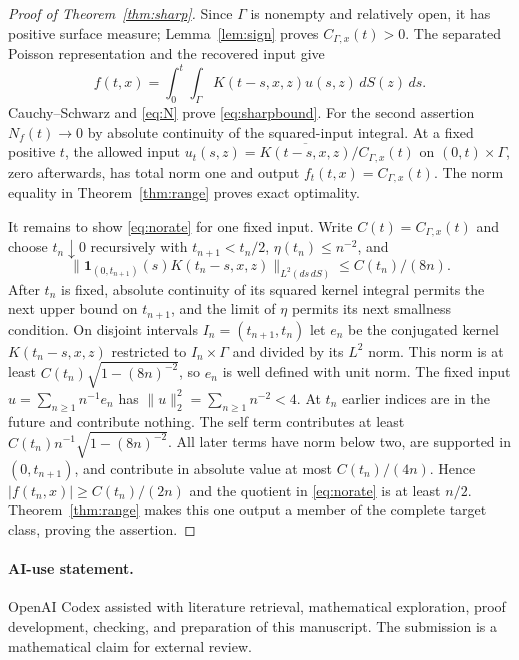 \documentclass[11pt]{article}
\theoremstyle{remark}
\begin{document}
\begin{proof}[Proof of Theorem~\ref{thm:sharp}]
Since $\Gamma$ is nonempty and relatively open, it has positive surface
measure; Lemma~\ref{lem:sign} proves $C_{\Gamma,x}(t)>0$.
The separated Poisson representation and the recovered input give
\[
 f(t,x)=\int_0^t\int_\Gamma K(t-s,x,z)u(s,z)\,dS(z)\,ds .
\]
Cauchy--Schwarz and \eqref{eq:N} prove \eqref{eq:sharpbound}.
For the second assertion $N_f(t)\to0$ by absolute continuity of the
squared-input integral.
At a fixed positive $t$, the allowed input
$u_t(s,z)=\overline{K(t-s,x,z)}/C_{\Gamma,x}(t)$ on
$(0,t)\times\Gamma$, zero afterwards, has total norm one and output
$f_t(t,x)=C_{\Gamma,x}(t)$.
The norm equality in Theorem~\ref{thm:range} proves exact optimality.

It remains to show \eqref{eq:norate} for one fixed input.
Write $C(t)=C_{\Gamma,x}(t)$ and choose $t_n\downarrow0$ recursively with
$t_{n+1}<t_n/2$, $\eta(t_n)\leq n^{-2}$, and
\[
 \|\mathbf1_{(0,t_{n+1})}(s)K(t_n-s,x,z)\|_{L^2(ds\,dS)}
                  \leq C(t_n)/(8n).
\]
After $t_n$ is fixed, absolute continuity of its squared kernel integral
permits the next upper bound on $t_{n+1}$, and the limit of $\eta$ permits
its next smallness condition.
On disjoint intervals $I_n=(t_{n+1},t_n)$ let $e_n$ be the conjugated
kernel $K(t_n-s,x,z)$ restricted to $I_n\times\Gamma$ and divided by its
$L^2$ norm.
This norm is at least $C(t_n)\sqrt{1-(8n)^{-2}}$, so $e_n$ is well defined
with unit norm.
The fixed input $u=\sum_{n\geq1}n^{-1}e_n$ has
$\|u\|_2^2=\sum_{n\geq1}n^{-2}<4$.
At $t_n$ earlier indices are in the future and contribute nothing.
The self term contributes at least
$C(t_n)n^{-1}\sqrt{1-(8n)^{-2}}$.
All later terms have norm below two, are supported in $(0,t_{n+1})$,
and contribute in absolute value at most $C(t_n)/(4n)$.
Hence $|f(t_n,x)|\geq C(t_n)/(2n)$ and the quotient in
\eqref{eq:norate} is at least $n/2$.
Theorem~\ref{thm:range} makes this one output a member of the complete
target class, proving the assertion.
\end{proof}

\paragraph{AI-use statement.}
OpenAI Codex assisted with literature retrieval, mathematical exploration,
proof development, checking, and preparation of this manuscript.
The submission is a mathematical claim for external review.
\end{document}
